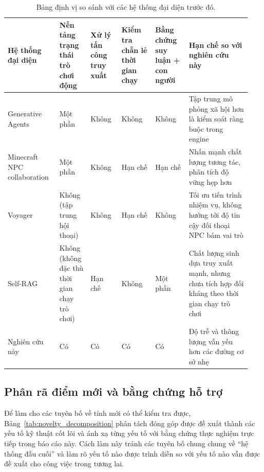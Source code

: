 ﻿\documentclass[a4paper,12pt]{article}
\begin{document}
\begin{table}[t]
\centering
\caption{Bảng định vị so sánh với các hệ thống đại diện trước đó.}
\label{tab:chapter2_positioning}
\begingroup
\small
\setlength{\tabcolsep}{3pt}
\renewcommand{\arraystretch}{1.15}
\begin{tabular}{>{\raggedright\arraybackslash}p{0.20\linewidth}
                >{\centering\arraybackslash}p{0.12\linewidth}
                >{\centering\arraybackslash}p{0.12\linewidth}
                >{\centering\arraybackslash}p{0.13\linewidth}
                >{\centering\arraybackslash}p{0.13\linewidth}
                >{\raggedright\arraybackslash}p{0.24\linewidth}}
\toprule
Hệ thống đại diện & Nền tảng trạng thái trò chơi động & Xử lý tấn công truy xuất & Kiểm tra chẵn lẻ thời gian chạy & Bằng chứng suy luận + con người & Hạn chế so với nghiên cứu này \\
\midrule
Generative Agents \cite{Park2023GenerativeAgents} & Một phần & Không & Không & Không & Tập trung mô phỏng xã hội hơn là kiểm soát ràng buộc trong engine \\
Minecraft NPC collaboration \cite{Rao2024Minecraft} & Một phần & Không & Hạn chế & Hạn chế & Nhấn mạnh chất lượng tương tác, phân tích độ vững hẹp hơn \\
Voyager \cite{Wang2023Voyager} & Không (tập trung hội thoại) & Không & Hạn chế & Không & Tối ưu tiến trình nhiệm vụ, không hướng tới độ tin cậy đối thoại NPC bám vai trò \\
Self-RAG \cite{Asai2024SelfRAG} & Không (không đặc thù thời gian chạy trò chơi) & Hạn chế & Không & Một phần & Chất lượng sinh dựa truy xuất mạnh, nhưng chưa tích hợp đối kháng theo thời gian chạy trò chơi \\
Nghiên cứu này & Có & Có & Có & Có & Độ trễ và thông lượng vẫn yếu hơn các đường cơ sở nhẹ \\
\bottomrule
\end{tabular}
\endgroup
\end{table}

\subsection{Phân rã điểm mới và bằng chứng hỗ trợ}
Để làm cho các tuyên bố về tính mới có thể kiểm tra được, Bảng~\ref{tab:novelty_decomposition} phân tách đóng góp được đề xuất thành các yếu tố kỹ thuật cốt lõi và ánh xạ từng yếu tố với bằng chứng thực nghiệm trực tiếp trong báo cáo này. Cách làm này tránh các tuyên bố chung chung về “hệ thống đầu cuối” và làm rõ yếu tố nào được trình diễn so với yếu tố nào vẫn được đề xuất cho công việc trong tương lai.
\end{document}
